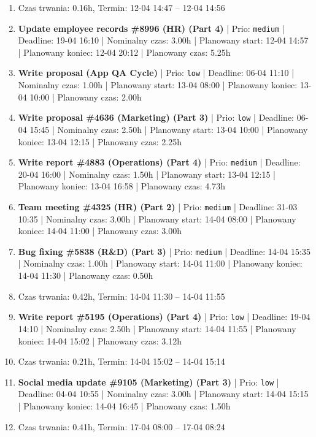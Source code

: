 {\begin{enumerate}
  \item [\textbf{PRZERWA}] Czas trwania: 0.16h, Termin: 12-04 14:47 -- 12-04 14:56
  \item [\textbf{14655}] \textbf{Update employee records \#8996 (HR) (Part 4)} | Prio: \texttt{medium} | Deadline: 19-04 16:10 | Nominalny czas: 3.00h | Planowany start: 12-04 14:57 | Planowany koniec: 12-04 20:12 | Planowany czas: 5.25h
  \item [\textbf{14695}] \textbf{Write proposal (App QA Cycle)} | Prio: \texttt{low} | Deadline: 06-04 11:10 | Nominalny czas: 1.00h | Planowany start: 13-04 08:00 | Planowany koniec: 13-04 10:00 | Planowany czas: 2.00h
  \item [\textbf{14684}] \textbf{Write proposal \#4636 (Marketing) (Part 3)} | Prio: \texttt{low} | Deadline: 06-04 15:45 | Nominalny czas: 2.50h | Planowany start: 13-04 10:00 | Planowany koniec: 13-04 12:15 | Planowany czas: 2.25h
  \item [\textbf{14651}] \textbf{Write report \#4883 (Operations) (Part 4)} | Prio: \texttt{medium} | Deadline: 20-04 16:00 | Nominalny czas: 1.50h | Planowany start: 13-04 12:15 | Planowany koniec: 13-04 16:58 | Planowany czas: 4.73h
  \item [\textbf{14641}] \textbf{Team meeting \#4325 (HR) (Part 2)} | Prio: \texttt{medium} | Deadline: 31-03 10:35 | Nominalny czas: 3.00h | Planowany start: 14-04 08:00 | Planowany koniec: 14-04 11:00 | Planowany czas: 3.00h
  \item [\textbf{14637}] \textbf{Bug fixing \#5838 (R\&D) (Part 3)} | Prio: \texttt{medium} | Deadline: 14-04 15:35 | Nominalny czas: 1.00h | Planowany start: 14-04 11:00 | Planowany koniec: 14-04 11:30 | Planowany czas: 0.50h
  \item [\textbf{PRZERWA}] Czas trwania: 0.42h, Termin: 14-04 11:30 -- 14-04 11:55
  \item [\textbf{14687}] \textbf{Write report \#5195 (Operations) (Part 4)} | Prio: \texttt{low} | Deadline: 19-04 14:10 | Nominalny czas: 2.50h | Planowany start: 14-04 11:55 | Planowany koniec: 14-04 15:02 | Planowany czas: 3.12h
  \item [\textbf{PRZERWA}] Czas trwania: 0.21h, Termin: 14-04 15:02 -- 14-04 15:14
  \item [\textbf{14698}] \textbf{Social media update \#9105 (Marketing) (Part 3)} | Prio: \texttt{low} | Deadline: 04-04 10:55 | Nominalny czas: 3.00h | Planowany start: 14-04 15:15 | Planowany koniec: 14-04 16:45 | Planowany czas: 1.50h
  \item [\textbf{PRZERWA}] Czas trwania: 0.41h, Termin: 17-04 08:00 -- 17-04 08:24

\end{enumerate}}
